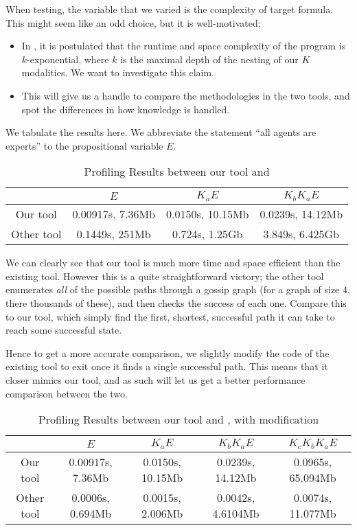 \documentclass[10pt, a4paper]{report}
\begin{document}
When testing, the variable that we varied is the complexity of target formula.
This might seem like an odd choice, but it is well-motivated;

\begin{itemize}
\item In \cite{AutomataTechniques}, it is postulated that the runtime and space
  complexity of the program is $k$-exponential, where $k$ is the maximal depth
  of the nesting of our $K$ modalities. We want to investigate this claim.
\item This will give us a handle to compare the methodologies in the two tools,
  and spot the differences in how knowledge is handled.
\end{itemize}

\bigskip

We tabulate the results here. We abbreviate the statement ``all agents are
experts'' to the propositional variable $E$. 

\begin{table}[h]
  \centering
  \begin{tabular}{|c||c|c|c|}
    \hline
    & $E$ & $ K_a E$ & $K_b K_a E$  \\ \hline 
    Our tool   & 0.00917s, 7.36Mb  & 0.0150s, 10.15Mb & 0.0239s, 14.12Mb \\ \hline 
    Other tool & 0.1449s, 251Mb & 0.724s, 1.25Gb & 3.849s, 6.425Gb \\ 
    \hline
  \end{tabular}
  \caption{Profiling Results between our tool and \cite{GithubGossip}}
  \label{tab:Proflining1}
\end{table}

We can clearly see that our tool is much more time and space efficient than the
existing tool. However this is a quite straightforward victory; the other tool
enumerates \emph{all} of the possible paths through a gossip graph (for a
graph of size 4, there thousands of these), and then checks the success of each
one. Compare this to our tool, which simply find the first, shortest, successful
path it can take to reach some successful state.

Hence to get a more accurate comparison, we slightly modify the code of the
existing tool to exit once it finds a single successful path. This means that it
closer mimics our tool, and as such will let us get a better performance
comparison between the two. 


\begin{table}[h]
  \centering
  \begin{tabular}{|c||c|c|c|c|}
    \hline
    & $E$ & $ K_a E$ & $K_b K_a E$ & $K_c K_b K_a E$ \\ \hline 
    Our tool   & 0.00917s, 7.36Mb  & 0.0150s, 10.15Mb & 0.0239s, 14.12Mb & 0.0965s, 65.094Mb \\ \hline 
    Other tool & 0.0006s, 0.694Mb  & 0.0015s, 2.006Mb & 0.0042s, 4.6104Mb & 0.0074s, 11.077Mb \\
    \hline
  \end{tabular}
  \caption{Profiling Results between our tool and \cite{GithubGossip}, with modification}
  \label{tab:Proflining2}
\end{table}
\end{document}
